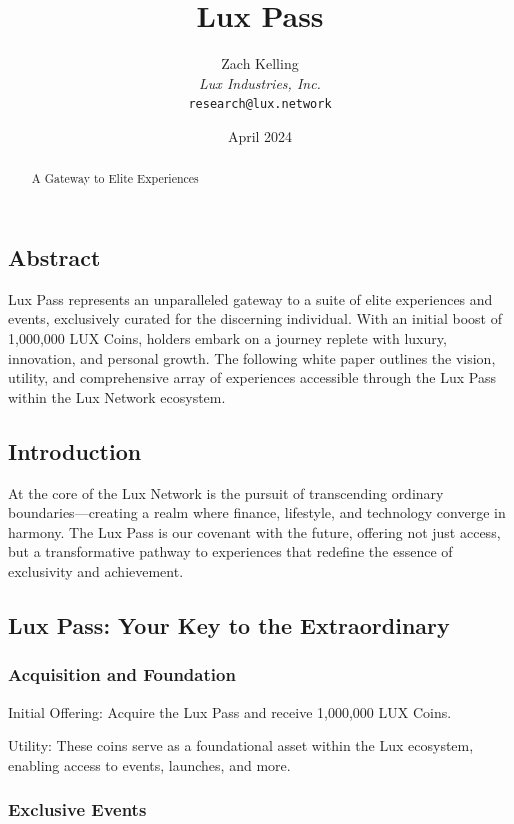 \documentclass[11pt]{article}
\title{Lux Pass}
\author{Zach Kelling\\\textit{Lux Industries, Inc.}\\\texttt{research@lux.network}}
\date{April 2024}
\begin{document}
\luxcoverpage

\begin{abstract}
A Gateway to Elite Experiences
\end{abstract}

\tableofcontents
\newpage


\subsection{Abstract}

Lux Pass represents an unparalleled gateway to a suite of elite experiences and events, exclusively curated for the discerning individual. With an initial boost of 1,000,000 LUX Coins, holders embark on a journey replete with luxury, innovation, and personal growth. The following white paper outlines the vision, utility, and comprehensive array of experiences accessible through the Lux Pass within the Lux Network ecosystem.


\subsection{Introduction}

At the core of the Lux Network is the pursuit of transcending ordinary boundaries---creating a realm where finance, lifestyle, and technology converge in harmony. The Lux Pass is our covenant with the future, offering not just access, but a transformative pathway to experiences that redefine the essence of exclusivity and achievement.


\subsection{Lux Pass: Your Key to the Extraordinary}

\subsubsection{Acquisition and Foundation}

Initial Offering: Acquire the Lux Pass and receive 1,000,000 LUX Coins.


Utility: These coins serve as a foundational asset within the Lux ecosystem, enabling access to events, launches, and more.


\subsubsection{Exclusive Events}
\end{document}
